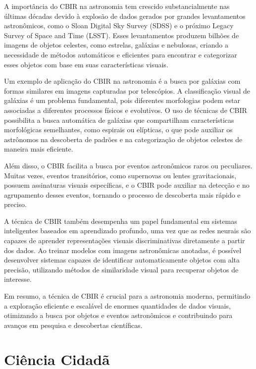 A importância do CBIR na astronomia tem crescido substancialmente nas últimas décadas devido à explosão de dados gerados por grandes levantamentos astronômicos, como o Sloan Digital Sky Survey (SDSS) e o próximo Legacy Survey of Space and Time (LSST). Esses levantamentos produzem bilhões de imagens de objetos celestes, como estrelas, galáxias e nebulosas, criando a necessidade de métodos automáticos e eficientes para encontrar e categorizar esses objetos com base em suas características visuais.

Um exemplo de aplicação do CBIR na astronomia é a busca por galáxias com formas similares em imagens capturadas por telescópios. A classificação visual de galáxias é um problema fundamental, pois diferentes morfologias podem estar associadas a diferentes processos físicos e evolutivos. O uso de técnicas de CBIR possibilita a busca automática de galáxias que compartilham características morfológicas semelhantes, como espirais ou elípticas, o que pode auxiliar os astrônomos na descoberta de padrões e na categorização de objetos celestes de maneira mais eficiente.

Além disso, o CBIR facilita a busca por eventos astronômicos raros ou peculiares. Muitas vezes, eventos transitórios, como supernovas ou lentes gravitacionais, possuem assinaturas visuais específicas, e o CBIR pode auxiliar na detecção e no agrupamento desses eventos, tornando o processo de descoberta mais rápido e preciso.

A técnica de CBIR também desempenha um papel fundamental em sistemas inteligentes baseados em aprendizado profundo, uma vez que as redes neurais são capazes de aprender representações visuais discriminativas diretamente a partir dos dados. Ao treinar modelos com imagens astronômicas anotadas, é possível desenvolver sistemas capazes de identificar automaticamente objetos com alta precisão, utilizando métodos de similaridade visual para recuperar objetos de interesse.

Em resumo, a técnica de CBIR é crucial para a astronomia moderna, permitindo a exploração eficiente e escalável de enormes quantidades de dados visuais, otimizando a busca por objetos e eventos astronômicos e contribuindo para avanços em pesquisa e descobertas científicas.


\section{Ciência Cidadã}

